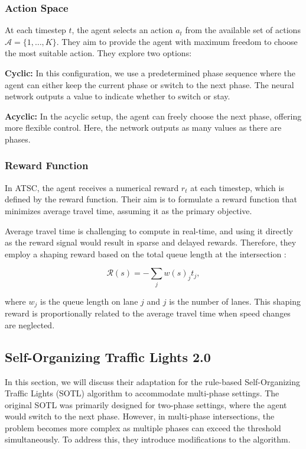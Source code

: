 \subsubsection{Action Space} \label{rlight_action_space}
\label{sec:action_space}

At each timestep \(t\), the agent selects an action \(a_t\) from the available set of actions \(\mathcal{A} = \{1, \ldots, K\}\). They aim to provide the agent with maximum freedom to choose the most suitable action. They explore two options:

\textbf{Cyclic:} In this configuration, we use a predetermined phase sequence where the agent can either keep the current phase or switch to the next phase. The neural network outputs a value to indicate whether to switch or stay.

\textbf{Acyclic:} In the acyclic setup, the agent can freely choose the next phase, offering more flexible control. Here, the network outputs as many values as there are phases.

\subsubsection{Reward Function}
\label{sec:reward_function}

In ATSC, the agent receives a numerical reward \(r_t\) at each timestep, which is defined by the reward function. Their aim is to formulate a reward function that minimizes average travel time, assuming it as the primary objective.

Average travel time is challenging to compute in real-time, and using it directly as the reward signal would result in sparse and delayed rewards. Therefore, they employ a shaping reward based on the total queue length at the intersection \cite{zheng2019diagnosing}:

\[
\mathcal{R}(s) = - \sum_j w(s)_j t_j,
\]

where \(w_j\) is the queue length on lane \(j\) and \(j\) is the number of lanes. This shaping reward is proportionally related to the average travel time when speed changes are neglected.

\subsection{Self-Organizing Traffic Lights 2.0}
\label{sec:sotl_2.0}

In this section, we will discuss their adaptation for the rule-based Self-Organizing Traffic Lights (SOTL) algorithm to accommodate multi-phase settings. The original SOTL was primarily designed for two-phase settings, where the agent would switch to the next phase. However, in multi-phase intersections, the problem becomes more complex as multiple phases can exceed the threshold simultaneously. To address this, they introduce modifications to the algorithm.

